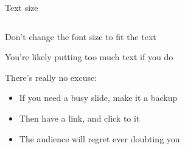 \documentclass[notes,11pt, aspectratio=169]{beamer}
\newenvironment{wideitemize}{\itemize\addtolength{\itemsep}{10pt}}{\enditemize}
\begin{document}
\begin{frame}{Text size}
\begin{columns}[T] %
\begin{column}{.58\textwidth}
  \begin{wideitemize}
    \item Don't change the font size to fit the text
    \item You're likely putting too much text if you do
    \item There's really no excuse:
      \begin{itemize}
      \item If you need a busy slide, make it a backup
      \item Then have a link, and click to it
      \item The audience will regret ever doubting you
      \end{itemize}
  \end{wideitemize}
\end{column}
\hfill
\begin{column}{.4\textwidth}
\end{column}
\end{columns}
\end{frame}
\end{document}
